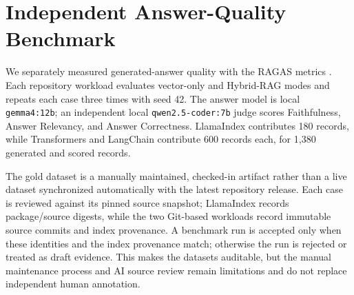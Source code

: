 \documentclass[12pt,letterpaper,oneside]{report}
\begin{document}
\section{Independent Answer-Quality Benchmark}
We separately measured generated-answer quality with the RAGAS metrics \cite{shahul2023ragas}. Each repository workload evaluates vector-only and Hybrid-RAG modes and repeats each case three times with seed 42. The answer model is local \texttt{gemma4:12b}; an independent local \texttt{qwen2.5-coder:7b} judge scores Faithfulness, Answer Relevancy, and Answer Correctness. LlamaIndex contributes 180 records, while Transformers and LangChain contribute 600 records each, for 1,380 generated and scored records.

The gold dataset is a manually maintained, checked-in artifact rather than a live dataset synchronized automatically with the latest repository release. Each case is reviewed against its pinned source snapshot; LlamaIndex records package/source digests, while the two Git-based workloads record immutable source commits and index provenance. A benchmark run is accepted only when these identities and the index provenance match; otherwise the run is rejected or treated as draft evidence. This makes the datasets auditable, but the manual maintenance process and AI source review remain limitations and do not replace independent human annotation.
\end{document}
